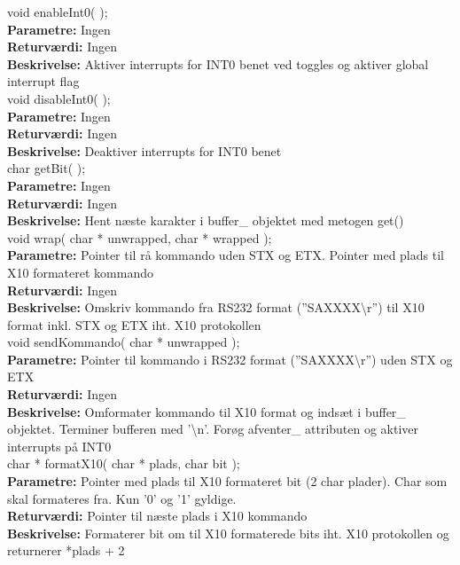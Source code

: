void enableInt0( ); \\
\textbf{Parametre:} Ingen \\
\textbf{Returværdi:} Ingen \\
\textbf{Beskrivelse:} Aktiver interrupts for INT0 benet ved toggles og aktiver global interrupt flag \\

void disableInt0( ); \\
\textbf{Parametre:} Ingen \\
\textbf{Returværdi:} Ingen \\
\textbf{Beskrivelse:} Deaktiver interrupts for INT0 benet \\

char getBit( ); \\
\textbf{Parametre:} Ingen \\
\textbf{Returværdi:} Ingen \\
\textbf{Beskrivelse:} Hent næste karakter i buffer\_ objektet med metogen get() \\

void wrap( char * unwrapped, char * wrapped ); \\
\textbf{Parametre:} Pointer til rå kommando uden STX og ETX. Pointer med plads til X10 formateret kommando \\
\textbf{Returværdi:} Ingen \\
\textbf{Beskrivelse:} Omskriv kommando fra RS232 format (''SAXXXX\textbackslash r'') til X10 format inkl. STX og ETX iht. X10 protokollen \\

void sendKommando( char * unwrapped ); \\
\textbf{Parametre:} Pointer til kommando i RS232 format (''SAXXXX\textbackslash r'') uden STX og ETX \\
\textbf{Returværdi:} Ingen \\
\textbf{Beskrivelse:} Omformater kommando til X10 format og indsæt i buffer\_ objektet. Terminer bufferen med '\textbackslash n'. Forøg afventer\_ attributen og aktiver interrupts på INT0 \\

char * formatX10( char * plads, char bit ); \\
\textbf{Parametre:} Pointer med plads til X10 formateret bit (2 char plader). Char som skal formateres fra. Kun '0' og '1' gyldige. \\
\textbf{Returværdi:} Pointer til næste plads i X10 kommando \\
\textbf{Beskrivelse:} Formaterer bit om til X10 formaterede bits iht. X10 protokollen og returnerer *plads + 2 \\

